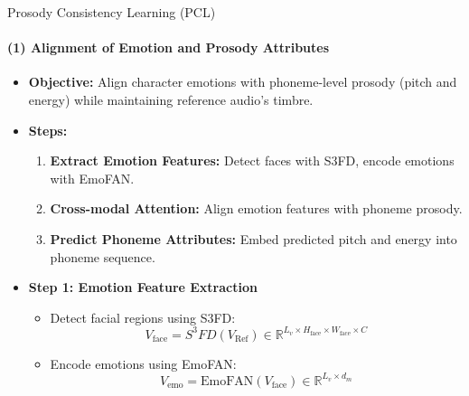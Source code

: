 \begin{frame}{Prosody Consistency Learning (PCL)}
\framesubtitle{(1) Alignment of Emotion and Prosody Attributes}
\begin{itemize}
    \item \textbf{Objective:} Align character emotions with phoneme-level prosody (pitch and energy) while maintaining reference audio's timbre.
    \item \textbf{Steps:}
    \begin{enumerate}
        \item \textbf{Extract Emotion Features:} Detect faces with S3FD, encode emotions with EmoFAN.
        \item \textbf{Cross-modal Attention:} Align emotion features with phoneme prosody.
        \item \textbf{Predict Phoneme Attributes:} Embed predicted pitch and energy into phoneme sequence.
    \end{enumerate}
    \item \textbf{Step 1: Emotion Feature Extraction}
    \begin{itemize}
        \item Detect facial regions using S3FD:
        \begin{equation}
            V_{\text{face}} = S^3FD(V_{\text{Ref}}) \in \mathbb{R}^{L_v \times H_{\text{face}} \times W_{\text{face}} \times C}
        \end{equation}
        \item Encode emotions using EmoFAN:
        \begin{equation}
            V_{\text{emo}} = \text{EmoFAN}(V_{\text{face}}) \in \mathbb{R}^{L_v \times d_m}
        \end{equation}
    \end{itemize}
\end{itemize}
\end{frame}

